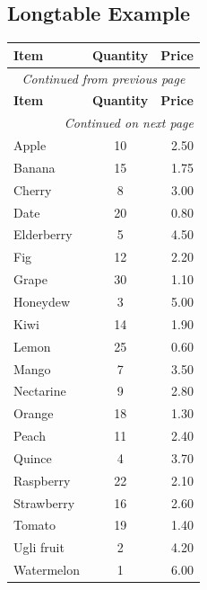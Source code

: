 \documentclass[12pt, a4paper]{article}
\begin{document}
\begin{english}

\section*{Longtable Example}

\begin{longtable}{|l|c|r|}
  \hline
  \textbf{Item} & \textbf{Quantity} & \textbf{Price} \\
  \hline
  \endfirsthead

  \multicolumn{3}{c}{\textit{Continued from previous page}} \\
  \hline
  \textbf{Item} & \textbf{Quantity} & \textbf{Price} \\
  \hline
  \endhead

  \hline
  \multicolumn{3}{r}{\textit{Continued on next page}} \\
  \hline
  \endfoot

  \hline
  \endlastfoot

  Apple    & 10 & 2.50  \\
  Banana   & 15 & 1.75  \\
  Cherry   & 8  & 3.00  \\
  Date     & 20 & 0.80  \\
  Elderberry & 5 & 4.50  \\
  Fig      & 12 & 2.20  \\
  Grape    & 30 & 1.10  \\
  Honeydew & 3  & 5.00  \\
  Kiwi     & 14 & 1.90  \\
  Lemon    & 25 & 0.60  \\
  Mango    & 7  & 3.50  \\
  Nectarine & 9 & 2.80  \\
  Orange   & 18 & 1.30  \\
  Peach    & 11 & 2.40  \\
  Quince   & 4  & 3.70  \\
  Raspberry & 22 & 2.10  \\
  Strawberry & 16 & 2.60  \\
  Tomato   & 19 & 1.40  \\
  Ugli fruit & 2 & 4.20  \\
  Watermelon & 1 & 6.00  \\
\end{longtable}

\end{english}
\end{document}

